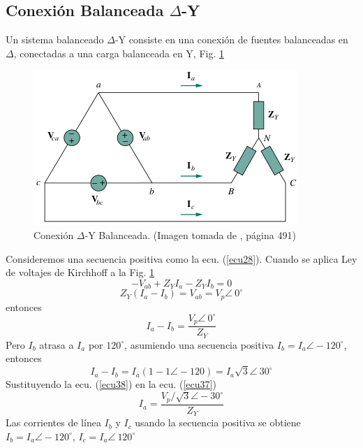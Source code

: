 \documentclass[twocolumn]{IEEEtran}
\begin{document}
\subsection{Conexión Balanceada $\Delta$-Y}
\noindent
Un sistema balanceado $\Delta$-Y consiste en una conexión de fuentes balanceadas en $\Delta$, conectadas a una carga balanceada en Y, Fig. \ref{fig12}
\begin{figure}[H]
	\centering
		\includegraphics[scale=0.65]{deltay.png}
	\caption{Conexión $\Delta$-Y Balanceada. (Imagen tomada de \cite{sadiku}, página 491)}
	\label{fig12}
\end{figure}
\noindent
Consideremos una secuencia positiva como la ecu. (\ref{ecu28}). Cuando se aplica Ley de voltajes de Kirchhoff a la Fig. \ref{fig12}
\begin{equation}
 -V_{ab} + Z_Y I_a - Z_Y I_b = 0
\label{ecu35}
\end{equation}
\begin{equation}
 Z_Y ( I_a - I_b ) = V_{ab} = V_p \angle\ 0 ^ \circ
\label{ecu36}
\end{equation}
\noindent
entonces
\begin{equation}
 I_a - I_b = \frac{V_p \angle \ 0 ^\circ }{Z_Y}
\label{ecu37}
\end{equation}
\noindent
Pero $I_b$ atrasa a $I_a$ por $120 ^ \circ$, asumiendo una secuencia positiva $I_b = I_a \angle -120 ^ \circ$, entonces
\begin{equation}
 I_a - I_b = I_a(1 - 1 \angle -120 ) = I_a \sqrt{3} \angle\ 30 ^ \circ
\label{ecu38}
\end{equation}
\noindent
Sustituyendo la ecu. (\ref{ecu38}) en la ecu. (\ref{ecu37})
\begin{equation}
 I_a = \frac{V_p / \sqrt{3}\angle -30 ^ \circ}{Z_Y}
\label{ecu39}
\end{equation}
\noindent
Las corrientes de línea $I_b$ y $I_c$ usando la secuencia positiva se obtiene $I_b = I_a \angle -120 ^ \circ$, $I_c = I_a \angle\ 120 ^ \circ$
\end{document}
